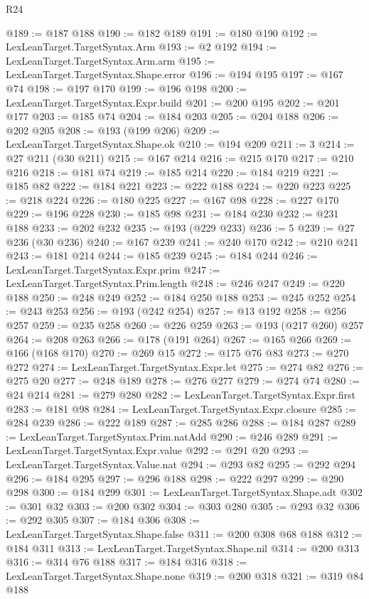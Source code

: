 \begin{lexlean}{R24}
\begin{coremodule}
@189 := @187 @188
@190 := @182 @189
@191 := @180 @190
@192 := LexLeanTarget.TargetSyntax.Arm
@193 := @2 @192
@194 := LexLeanTarget.TargetSyntax.Arm.arm
@195 := LexLeanTarget.TargetSyntax.Shape.error
@196 := @194 @195
@197 := @167 @74
@198 := @197 @170
@199 := @196 @198
@200 := LexLeanTarget.TargetSyntax.Expr.build
@201 := @200 @195
@202 := @201 @177
@203 := @185 @74
@204 := @184 @203
@205 := @204 @188
@206 := @202 @205
@208 := @193 (@199 @206)
@209 := LexLeanTarget.TargetSyntax.Shape.ok
@210 := @194 @209
@211 := 3
@214 := @27 @211 (@30 @211)
@215 := @167 @214
@216 := @215 @170
@217 := @210 @216
@218 := @181 @74
@219 := @185 @214
@220 := @184 @219
@221 := @185 @82
@222 := @184 @221
@223 := @222 @188
@224 := @220 @223
@225 := @218 @224
@226 := @180 @225
@227 := @167 @98
@228 := @227 @170
@229 := @196 @228
@230 := @185 @98
@231 := @184 @230
@232 := @231 @188
@233 := @202 @232
@235 := @193 (@229 @233)
@236 := 5
@239 := @27 @236 (@30 @236)
@240 := @167 @239
@241 := @240 @170
@242 := @210 @241
@243 := @181 @214
@244 := @185 @239
@245 := @184 @244
@246 := LexLeanTarget.TargetSyntax.Expr.prim
@247 := LexLeanTarget.TargetSyntax.Prim.length
@248 := @246 @247
@249 := @220 @188
@250 := @248 @249
@252 := @184 @250 @188
@253 := @245 @252
@254 := @243 @253
@256 := @193 (@242 @254)
@257 := @13 @192
@258 := @256 @257
@259 := @235 @258
@260 := @226 @259
@263 := @193 (@217 @260) @257
@264 := @208 @263
@266 := @178 (@191 @264)
@267 := @165 @266
@269 := @166 (@168 @170)
@270 := @269 @15
@272 := @175 @76 @83
@273 := @270 @272
@274 := LexLeanTarget.TargetSyntax.Expr.let
@275 := @274 @82
@276 := @275 @20
@277 := @248 @189
@278 := @276 @277
@279 := @274 @74
@280 := @24 @214
@281 := @279 @280
@282 := LexLeanTarget.TargetSyntax.Expr.first
@283 := @181 @98
@284 := LexLeanTarget.TargetSyntax.Expr.closure
@285 := @284 @239
@286 := @222 @189
@287 := @285 @286
@288 := @184 @287
@289 := LexLeanTarget.TargetSyntax.Prim.natAdd
@290 := @246 @289
@291 := LexLeanTarget.TargetSyntax.Expr.value
@292 := @291 @20
@293 := LexLeanTarget.TargetSyntax.Value.nat
@294 := @293 @82
@295 := @292 @294
@296 := @184 @295
@297 := @296 @188
@298 := @222 @297
@299 := @290 @298
@300 := @184 @299
@301 := LexLeanTarget.TargetSyntax.Shape.adt
@302 := @301 @32
@303 := @200 @302
@304 := @303 @280
@305 := @293 @32
@306 := @292 @305
@307 := @184 @306
@308 := LexLeanTarget.TargetSyntax.Shape.false
@311 := @200 @308 @68 @188
@312 := @184 @311
@313 := LexLeanTarget.TargetSyntax.Shape.nil
@314 := @200 @313
@316 := @314 @76 @188
@317 := @184 @316
@318 := LexLeanTarget.TargetSyntax.Shape.none
@319 := @200 @318
@321 := @319 @84 @188

\end{coremodule}
\end{lexlean}
